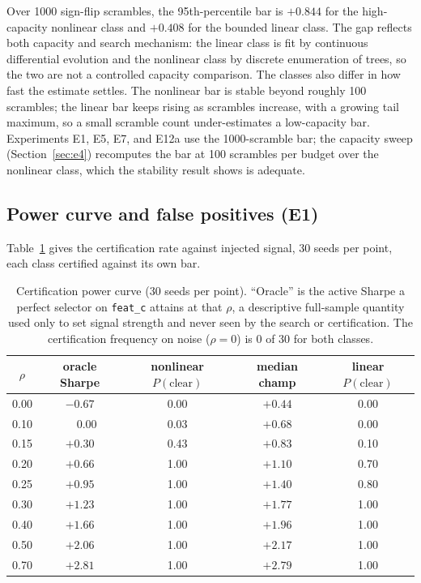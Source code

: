 \documentclass[11pt]{article}
\newcommand{\code}[1]{\texttt{#1}}
\begin{document}
Over 1000 sign-flip scrambles, the 95th-percentile bar is $+0.844$ for the high-capacity nonlinear
class and $+0.408$ for the bounded linear class. The gap reflects both capacity and search mechanism:
the linear class is fit by continuous differential evolution and the nonlinear class by discrete
enumeration of trees, so the two are not a controlled capacity comparison. The classes also differ in
how fast the estimate settles. The nonlinear bar is stable beyond roughly 100 scrambles; the linear
bar keeps rising as scrambles increase, with a growing tail maximum, so a small scramble count
under-estimates a low-capacity bar. Experiments E1, E5, E7, and E12a use the 1000-scramble bar; the
capacity sweep (Section~\ref{sec:e4}) recomputes the bar at 100 scrambles per budget over the
nonlinear class, which the stability result shows is adequate.

\subsection{Power curve and false positives (E1)}
\label{sec:e1}

Table~\ref{tab:power} gives the certification rate against injected signal, 30 seeds per point, each
class certified against its own bar.

\begin{table}[htbp]
\centering
\caption{Certification power curve (30 seeds per point). ``Oracle'' is the active Sharpe a perfect
selector on \code{feat\_c} attains at that $\rho$, a descriptive full-sample quantity used only to set
signal strength and never seen by the search or certification. The certification frequency on noise
($\rho=0$) is 0 of 30 for both classes.}
\label{tab:power}
\small
\begin{tabular}{c c c c c}
\toprule
$\rho$ & oracle Sharpe & nonlinear $P(\text{clear})$ & median champ & linear $P(\text{clear})$ \\
\midrule
0.00 & $-0.67$ & 0.00 & $+0.44$ & 0.00 \\
0.10 & $\phantom{+}0.00$ & 0.03 & $+0.68$ & 0.00 \\
0.15 & $+0.30$ & 0.43 & $+0.83$ & 0.10 \\
0.20 & $+0.66$ & 1.00 & $+1.10$ & 0.70 \\
0.25 & $+0.95$ & 1.00 & $+1.40$ & 0.80 \\
0.30 & $+1.23$ & 1.00 & $+1.77$ & 1.00 \\
0.40 & $+1.66$ & 1.00 & $+1.96$ & 1.00 \\
0.50 & $+2.06$ & 1.00 & $+2.17$ & 1.00 \\
0.70 & $+2.81$ & 1.00 & $+2.79$ & 1.00 \\
\bottomrule
\end{tabular}
\end{table}
\end{document}
